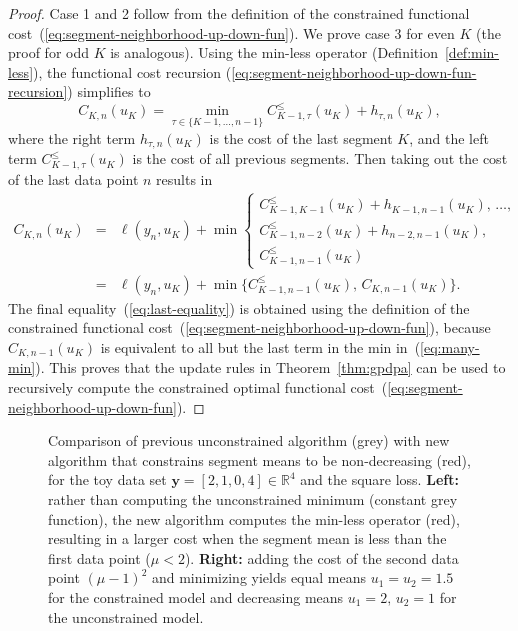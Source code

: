 \documentclass[twoside,11pt]{article}
\newcommand{\RR}{\mathbb R}
\begin{document}
\begin{proof}
  Case 1 and 2 follow from the definition of the constrained
  functional cost~(\ref{eq:segment-neighborhood-up-down-fun}). We prove
  case 3 for even $K$ (the proof for odd $K$ is analogous).  Using the min-less operator (Definition~\ref{def:min-less}), the
  functional cost recursion
   (\ref{eq:segment-neighborhood-up-down-fun-recursion})  
 simplifies to
  \begin{equation}
    C_{K,n}(u_K) 
= \min_{\tau\in\{K-1,\dots,n-1\}}
C_{K-1,\tau}^\leq(u_{K}) + h_{\tau,n}(u_K),
  \end{equation}
  where the right term $h_{\tau,n}(u_K)$ is the cost of the last segment $K$,
  and the left term $C_{K-1,\tau}^\leq(u_{K})$ is the  cost of all previous segments. Then taking out the cost of the last data point
    $n$ results in
  \begin{eqnarray}
    C_{K,n}(u_K)&=&\ell(y_n, u_K) + \min
    \begin{cases}
      C_{K-1,K-1}^\leq(u_{K}) + h_{K-1,n-1}(u_K),\, \dots,\\
      C_{K-1,n-2}^\leq(u_{K}) + h_{n-2,n-1}(u_K),\\
      C_{K-1,n-1}^\leq(u_{K})
    \end{cases}\\
\label{eq:many-min}
&=& \ell(y_n,u_K) + \min\{
C_{K-1,n-1}^\leq(u_{K}),\,
C_{K,n-1}(u_K)\}.
\label{eq:last-equality}
  \end{eqnarray}
  The final equality~(\ref{eq:last-equality}) is obtained using the
  definition of the constrained functional
  cost~(\ref{eq:segment-neighborhood-up-down-fun}), because
  $C_{K,n-1}(u_K)$ is equivalent to all but the last term in the min
  in~(\ref{eq:many-min}). This proves that the update rules in Theorem~\ref{thm:gpdpa} can be used to recursively compute the constrained optimal functional cost~(\ref{eq:segment-neighborhood-up-down-fun}).
\end{proof}

\begin{figure}[t!]
  \centering
  
  
  \vskip -0.5cm
  \caption{Comparison of previous unconstrained algorithm
    (\textcolor{Min}{grey}) with new algorithm that constrains segment
    means to be non-decreasing (\textcolor{Ckt}{red}), for the toy data
    set $\mathbf y= [ 2, 1, 0, 4 ] \in\RR^4$ and the square
    loss. \textbf{Left:} rather than computing the unconstrained
    minimum (constant grey function), the new algorithm computes the
    min-less operator (red), resulting in a larger cost when the
    segment mean is less than the first data point ($\mu <
    2$). \textbf{Right:} adding the cost of the second data point
    $(\mu-1)^2$ and minimizing yields equal means $u_1=u_2=1.5$ for
    the constrained model and decreasing means $u_1=2,\, u_2=1$ for
    the unconstrained model.}
  \label{fig:compare-unconstrained}
\end{figure}
\end{document}
